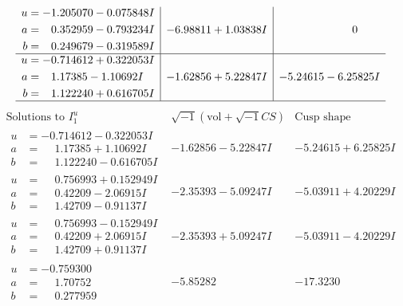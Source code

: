 \documentclass[1p]{elsarticle_modified}
\theoremstyle{definition}
\newcommand{\I}{\sqrt{-1}}
\begin{document}
$$\begin{array}{c|c|c}
\begin{aligned}
u &= -1.205070 - 0.075848 I \\
a &= \phantom{-}0.352959 - 0.793234 I \\
b &= \phantom{-}0.249679 - 0.319589 I\end{aligned}
 & -6.98811 + 1.03838 I & \phantom{-0.000000 } 0 \\ \hline\begin{aligned}
u &= -0.714612 + 0.322053 I \\
a &= \phantom{-}1.17385 - 1.10692 I \\
b &= \phantom{-}1.122240 + 0.616705 I\end{aligned}
 & -1.62856 + 5.22847 I & -5.24615 - 6.25825 I\\
 \hline 
 \end{array}$$\newpage$$\begin{array}{c|c|c}  
\text{Solutions to }I^u_{1}& \I (\text{vol} + \sqrt{-1}CS) & \text{Cusp shape}\\
 \hline 
\begin{aligned}
u &= -0.714612 - 0.322053 I \\
a &= \phantom{-}1.17385 + 1.10692 I \\
b &= \phantom{-}1.122240 - 0.616705 I\end{aligned}
 & -1.62856 - 5.22847 I & -5.24615 + 6.25825 I \\ \hline\begin{aligned}
u &= \phantom{-}0.756993 + 0.152949 I \\
a &= \phantom{-}0.42209 - 2.06915 I \\
b &= \phantom{-}1.42709 - 0.91137 I\end{aligned}
 & -2.35393 - 5.09247 I & -5.03911 + 4.20229 I \\ \hline\begin{aligned}
u &= \phantom{-}0.756993 - 0.152949 I \\
a &= \phantom{-}0.42209 + 2.06915 I \\
b &= \phantom{-}1.42709 + 0.91137 I\end{aligned}
 & -2.35393 + 5.09247 I & -5.03911 - 4.20229 I \\ \hline\begin{aligned}
u &= -0.759300\phantom{ +0.000000I} \\
a &= \phantom{-}1.70752\phantom{ +0.000000I} \\
b &= \phantom{-}0.277959\phantom{ +0.000000I}\end{aligned}
 & -5.85282\phantom{ +0.000000I} & -17.3230\phantom{ +0.000000I} \\ \hline\begin{aligned}

\end{aligned}
\end{array}$$
\end{document}
